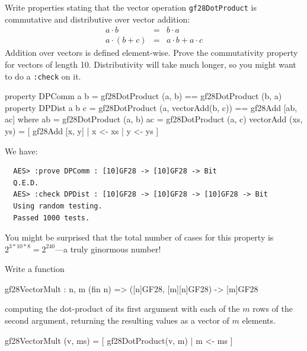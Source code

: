 \begin{Exercise}\label{ex:aesmc:1}
  Write properties stating that the vector operation
  \texttt{gf28DotProduct} is commutative and distributive over vector
  addition:
\begin{eqnarray*}
a \cdot b &=& b \cdot a \\
a \cdot (b + c) &=& a\cdot b + a\cdot c
\end{eqnarray*}
Addition over vectors is defined element-wise. Prove the commutativity
property for vectors of length 10.  Distributivity will take much
longer, so you might want to do a \texttt{:check} on it.\indCmdCheck
{}
\end{Exercise}
\begin{Answer}
\begin{code}
  property DPComm a b =     gf28DotProduct (a, b) == gf28DotProduct (b, a)
  property DPDist a b c =   gf28DotProduct (a, vectorAdd(b, c)) ==
                            gf28Add [ab, ac]
     where   ab = gf28DotProduct (a, b)
             ac = gf28DotProduct (a, c)
             vectorAdd (xs, ys) = [ gf28Add [x, y] | x <- xs
                                                   | y <- ys
                                  ]
\end{code}
We have:
\begin{Verbatim}
  AES> :prove DPComm : [10]GF28 -> [10]GF28 -> Bit
  Q.E.D.
  AES> :check DPDist : [10]GF28 -> [10]GF28 -> [10]GF28 -> Bit
  Using random testing.
  Passed 1000 tests.
\end{Verbatim}
You might be surprised that the total number of cases for this
property is $2^{3*10*8} = 2^{240}$---a truly ginormous number!
\end{Answer}

\begin{Exercise}\label{ex:aesmc:2}
Write a function
\begin{code}
  gf28VectorMult : {n, m} (fin n) => ([n]GF28, [m][n]GF28) -> [m]GF28
\end{code}
computing the dot-product of its first argument with each of the $m$
rows of the second argument, returning the resulting values as a
vector of $m$ elements.
\end{Exercise}
\begin{Answer}
\begin{code}
  gf28VectorMult (v, ms) = [ gf28DotProduct(v, m) | m <- ms ]
\end{code}
\end{Answer}

